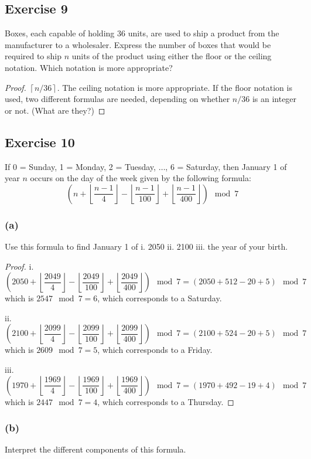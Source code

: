 \documentclass[14pt]{extarticle}
\newcommand{\cy}{\color{cyan}}
\newcommand{\floor}[1]{{\left\lfloor#1\right\rfloor}}
\newcommand{\ceil}[1]{{\left\lceil#1\right\rceil}}
\begin{document}
\subsection{Exercise 9}
Boxes, each capable of holding 36 units, are used to ship a product from the manufacturer to a wholesaler. Express the number of boxes that would be required to ship $n$ units of the product using either the floor or the ceiling notation. Which notation is more appropriate?

\begin{proof}
$\ceil{n/36}$. The ceiling notation is more appropriate. If the floor notation is used, two different formulas are needed, depending on whether $n/36$ is an integer or not. (What are they?)
\end{proof}

\subsection{Exercise 10}
If 0 = Sunday, 1 = Monday, 2 = Tuesday, $\ldots$, 6 = Saturday, then January 1 of year $n$ occurs on the day of the week given by the following formula:
\[
\left(n + \floor{\frac{n-1}{4}} - \floor{\frac{n-1}{100}} + \floor{\frac{n-1}{400}}\right) \mod 7
\]
\subsubsection{(a)}
Use this formula to find January 1 of {\cy i.} 2050 {\cy ii.} 2100 {\cy iii.} the year of your birth.

\begin{proof}
{\cy i.}
\[
\left(2050 + \floor{\frac{2049}{4}} - \floor{\frac{2049}{100}} + \floor{\frac{2049}{400}}\right) \mod 7 = (2050+512-20+5) \mod 7
\]
which is $2547 \mod 7 = 6$, which corresponds to a Saturday.

{\cy ii.}
\[
\left(2100 + \floor{\frac{2099}{4}} - \floor{\frac{2099}{100}} + \floor{\frac{2099}{400}}\right) \mod 7 = (2100+524-20+5) \mod 7
\]
which is $2609 \mod 7 = 5$, which corresponds to a Friday.

{\cy iii.}
\[
\left(1970 + \floor{\frac{1969}{4}} - \floor{\frac{1969}{100}} + \floor{\frac{1969}{400}}\right) \mod 7 = (1970+492-19+4) \mod 7
\]
which is $2447 \mod 7 = 4$, which corresponds to a Thursday.
\end{proof}

\subsubsection{(b)}
Interpret the different components of this formula.
\end{document}
